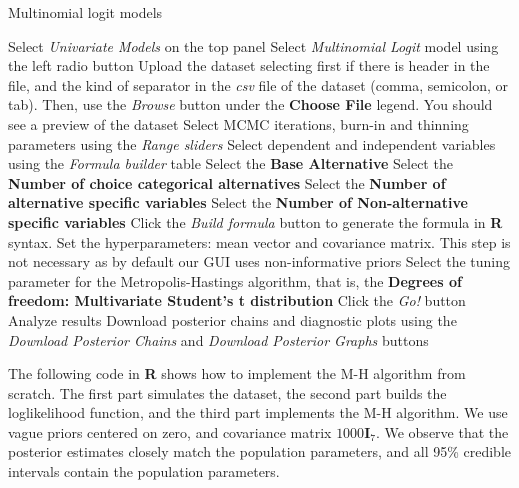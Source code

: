 \begin{algorithm}[h!]
	\caption{Multinomial logit models}\label{alg:MultinomialLogit}
	\begin{algorithmic}[1]  		 			
		\State Select \textit{Univariate Models} on the top panel
		\State Select \textit{Multinomial Logit} model using the left radio button
		\State Upload the dataset selecting first if there is header in the file, and the kind of separator in the \textit{csv} file of the dataset (comma, semicolon, or tab). Then, use the \textit{Browse} button under the \textbf{Choose File} legend. You should see a preview of the dataset
		\State Select MCMC iterations, burn-in and thinning parameters using the \textit{Range sliders}
		\State Select dependent and independent variables using the \textit{Formula builder} table
		\State Select the \textbf{Base Alternative}
		\State Select the \textbf{Number of choice categorical alternatives}
		\State Select the \textbf{Number of alternative specific variables}
		\State Select the \textbf{Number of Non-alternative specific variables} 
		\State Click the \textit{Build formula} button to generate the formula in \textbf{R} syntax.
		\State Set the hyperparameters: mean vector and covariance matrix. This step is not necessary as by default our GUI uses non-informative priors
		\State Select the tuning parameter for the Metropolis-Hastings algorithm, that is, the \textbf{Degrees of freedom: Multivariate Student's t distribution} 
		\State Click the \textit{Go!} button
		\State Analyze results
		\State Download posterior chains and diagnostic plots using the \textit{Download Posterior Chains} and \textit{Download Posterior Graphs} buttons
	\end{algorithmic} 
\end{algorithm}

The following code in \textbf{R} shows how to implement the M-H algorithm from scratch. The first part simulates the dataset, the second part builds the loglikelihood function, and the third part implements the M-H algorithm. We use vague priors centered on zero, and covariance matrix $1000\bm{I}_{7}$. We observe that the posterior estimates closely match the population parameters, and all 95\% credible intervals contain the population parameters.  


